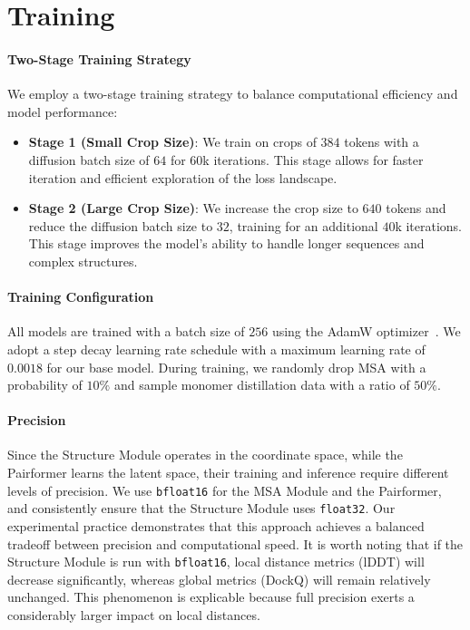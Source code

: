 \section{Training}
\label{sec:training}

\paragraph{Two-Stage Training Strategy}
We employ a two-stage training strategy to balance computational efficiency and model performance:

\begin{itemize}
    \item \textbf{Stage 1 (Small Crop Size)}: We train on crops of $384$ tokens with a diffusion batch size of $64$ for $60$k iterations. This stage allows for faster iteration and efficient exploration of the loss landscape.
    \item \textbf{Stage 2 (Large Crop Size)}: We increase the crop size to $640$ tokens and reduce the diffusion batch size to $32$, training for an additional $40$k iterations. This stage improves the model's ability to handle longer sequences and complex structures.
\end{itemize}

\paragraph{Training Configuration}
All models are trained with a batch size of $256$ using the AdamW optimizer~\cite{loshchilov2017decoupled}. We adopt a step decay learning rate schedule with a maximum learning rate of $0.0018$ for our base model. During training, we randomly drop MSA with a probability of $10\%$ and sample monomer distillation data with a ratio of $50\%$. 

\paragraph{Precision} Since the Structure Module operates in the coordinate space, while the Pairformer learns the latent space, their training and inference require different levels of precision. We use \texttt{bfloat16} for the MSA Module and the Pairformer, and consistently ensure that the Structure Module uses \texttt{float32}. Our experimental practice demonstrates that this approach achieves a balanced tradeoff between precision and computational speed. It is worth noting that if the Structure Module is run with \texttt{bfloat16}, local distance metrics (lDDT) will decrease significantly, whereas global metrics (DockQ) will remain relatively unchanged. This phenomenon is explicable because full precision exerts a considerably larger impact on local distances.

